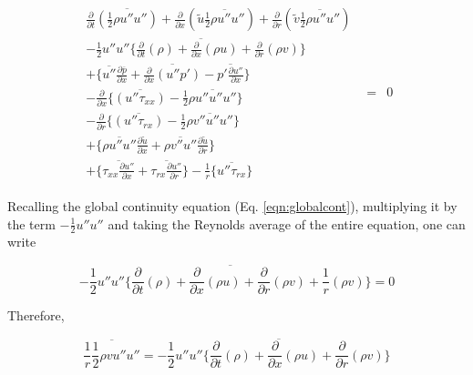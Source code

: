 \begin{displaymath}
   \begin{array}{ccc}
      \begin{array}{c}
	\frac{\partial}{\partial t}\overline{(\frac{1}{2}\rho u'' u'')}	+ \frac{\partial}{\partial x}
	(\tilde u \overline{\frac{1}{2}\rho u'' u''}) + \frac{\partial}{\partial r}(\tilde v \overline{\frac{1}{2}\rho u'' u''})\\
	-\overline{\frac{1}{2}u''u''\Big\{\frac{\partial}{\partial t}(\rho) + \frac{\partial}{\partial x}(\rho u)
	+ \frac{\partial}{\partial r}(\rho v)\Big\}} \\ 
	+ \Big\{ \overline{u''}\frac{\partial \overline{p}}{\partial x} + \overline{\frac{\partial}{\partial x}(u''p')} 
	- \overline {p'\frac{\partial u''}{\partial x}} \Big\} \\
	-\frac{\partial}{\partial x}\Big\{ \overline{(u''\tau_{xx})} - \frac{1}{2}\overline{\rho u'' u'' u''}\Big\} \\
	-\frac{\partial}{\partial r}\Big\{ \overline{(u''\tau_{rx})} - \frac{1}{2}\overline{\rho v'' u'' u''}\Big\} \\
	+ \Big\{\overline{\rho u'' u''}\frac{\partial \tilde u}{\partial x} +  \overline{\rho v'' u''}
	\frac{\partial \tilde u}{\partial r}  \Big\} \\
	+ \Big\{\overline{\tau_{xx}\frac{\partial u''}{\partial x}} + \overline{\tau_{rx}\frac{\partial u''}{\partial r}}  \Big\}
	-\frac{1}{r}\Big\{\overline{u''\tau_{rx}} \Big\}
      \end{array}
   & = & 0
   \end{array}	
\end{displaymath}

	Recalling the global continuity equation (Eq. \ref{eqn:globalcont}), multiplying it by the term
$-\frac{1}{2}u''u''$ and taking the Reynolds average of the entire equation, one can write

\begin{displaymath}
	 -\overline{\frac{1}{2}u''u''\Big\{\frac{\partial}{\partial t}(\rho) + \frac{\partial}{\partial x}(\rho u)
	+ \frac{\partial}{\partial r}(\rho v) + \frac{1}{r}(\rho v)\Big\}} = 0
\end{displaymath}

	Therefore,

\begin{displaymath}
	\overline{\frac{1}{r}\frac{1}{2}\rho v u''u''} = -\overline{\frac{1}{2}u''u''\Big\{\frac{\partial}{\partial t}(\rho) 
	+ \frac{\partial}{\partial x}(\rho u) + \frac{\partial}{\partial r}(\rho v)\Big\}}
\end{displaymath}

